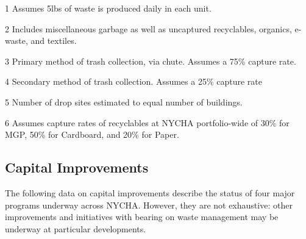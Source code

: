 \begin{table}[H]
\begin{threeparttable}
\small



\end{threeparttable}
\end{table}
\pagebreak
\begin{table}[H]
\begin{threeparttable}
\small



\begin{tablenotes}
\item [1] Assumes 5lbs of waste is produced daily in each unit.
\item [2] Includes miscellaneous garbage as well as uncaptured recyclables, organics, e-waste, and textiles.
\item [3] Primary method of trash collection, via chute. Assumes a 75\% capture rate.
\item [4] Secondary method of trash collection. Assumes a 25\% capture rate
\item [5] Number of drop sites estimated to equal number of buildings.
\item [6] Assumes capture rates of recyclables at NYCHA portfolio-wide of 30\% for MGP, 50\% for Cardboard, and 20\% for Paper. 
\end{tablenotes}
\end{threeparttable}
\end{table}


\pagebreak

\textcolor{ccorange}{\section{Capital Improvements}}

The following data on capital improvements describe the status of four major programs underway across NYCHA. However, they are not exhaustive: other improvements and initiatives with bearing on waste management may be underway at particular developments.
\begin{table}[H]
\small
\begin{tabular}{l}
\\

\end{tabular}
\end{table}
\pagebreak

